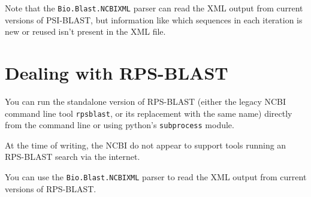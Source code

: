 Note that the \verb|Bio.Blast.NCBIXML| parser can read the XML output from
current versions of PSI-BLAST, but information like which sequences in each
iteration is new or reused isn't present in the XML file.

\section{Dealing with RPS-BLAST}

You can run the standalone version of RPS-BLAST (either the legacy NCBI
command line tool \verb|rpsblast|, or its replacement with the same name)
directly from the command line or using python's \verb|subprocess| module.

At the time of writing, the NCBI do not appear to support tools running an
RPS-BLAST search via the internet.

You can use the \verb|Bio.Blast.NCBIXML| parser to read the XML output from
current versions of RPS-BLAST.
